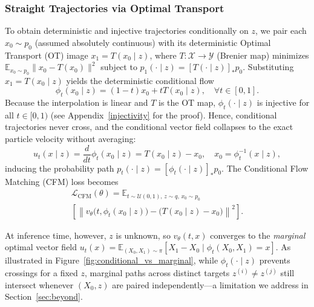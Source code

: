 \subsubsection{Straight Trajectories via Optimal Transport}

To obtain deterministic and injective trajectories conditionally on $z$, we pair each $x_0 \sim p_0$ (assumed absolutely continuous) with its deterministic Optimal Transport (OT) image $x_1 = T(x_0 \mid z)$, where $T: \mathcal{X} \to \mathcal{Y}$ (Brenier map) minimizes $\mathbb{E}_{x_0 \sim p_0}\|x_0 - T(x_0)\|^2$ subject to $p_1(\cdot \mid z) = [T(\cdot \mid z)]_* p_0$. Substituting $x_1 = T(x_0 \mid z)$ yields the deterministic conditional flow
\begin{equation}
    \phi_t(x_0 \mid z) = (1 - t) x_0 + t T(x_0 \mid z), \quad \forall t \in [0, 1].
\end{equation}
Because the interpolation is linear and $T$ is the OT map, $\phi_t(\cdot \mid z)$ is injective for all $t \in [0, 1)$ (see Appendix~\ref{injectivity} for the proof). Hence, conditional trajectories never cross, and the conditional vector field collapses to the exact particle velocity without averaging:
\begin{equation}
    u_t(x \mid z) = \frac{d}{dt}\phi_t(x_0 \mid z) = T(x_0 \mid z) - x_0, \quad x_0 = \phi_t^{-1}(x \mid z),
\end{equation}
inducing the probability path $p_t(\cdot \mid z) = [\phi_t(\cdot \mid z)]_* p_0$. The Conditional Flow Matching (CFM) loss becomes
\begin{multline}
    \mathcal{L}_{\text{CFM}}(\theta) = \mathbb{E}_{t \sim \mathcal{U}(0,1), \, z \sim q, \, x_0 \sim p_0} \\
        \left[ \left\| v_\theta\big(t, \phi_t(x_0 \mid z)\big) - \big(T(x_0 \mid z) - x_0\big) \right\|^2 \right].
\end{multline}

At inference time, however, $z$ is unknown, so $v_\theta(t, x)$ converges to the \emph{marginal} optimal vector field $u_t(x) = \mathbb{E}_{(X_0, X_1) \sim \pi}[X_1 - X_0 \mid \phi_t(X_0, X_1) = x]$. As illustrated in Figure~\ref{fig:conditional_vs_marginal}, while $\phi_t(\cdot \mid z)$ prevents crossings for a fixed $z$, marginal paths across distinct targets $z^{(i)} \neq z^{(j)}$ still intersect whenever $(X_0, z)$ are paired independently---a limitation we address in Section~\ref{sec:beyond}.

